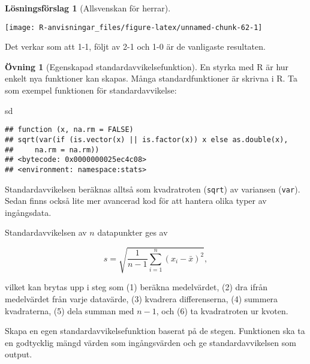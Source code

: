 \documentclass[
]{book}
\newenvironment{Shaded}{\begin{snugshade}}{\end{snugshade}}
\newcommand{\NormalTok}[1]{#1}
\theoremstyle{definition}
\theoremstyle{definition}
\theoremstyle{definition}
\newtheorem{exercise}{Övning}[chapter]
\theoremstyle{definition}
\newtheorem{hypothesis}{Lösningsförslag}[chapter]
\theoremstyle{remark}
\begin{document}
\begin{hypothesis}[Allsvenskan för herrar]
\begin{center}\texttt{[image: R-anvisningar\_files/figure-latex/unnamed-chunk-62-1]} \end{center}

Det verkar som att 1-1, följt av 2-1 och 1-0 är de vanligaste resultaten.
\end{hypothesis}

\begin{exercise}[Egenskapad standardavvikelsefunktion]
En styrka med R är hur enkelt nya funktioner kan skapas. Många standardfunktioner är skrivna i R. Ta som exempel funktionen för standardavvikelse:

\begin{Shaded}
\begin{Highlighting}[]
\NormalTok{sd}
\end{Highlighting}
\end{Shaded}

\begin{verbatim}
## function (x, na.rm = FALSE) 
## sqrt(var(if (is.vector(x) || is.factor(x)) x else as.double(x), 
##     na.rm = na.rm))
## <bytecode: 0x0000000025ec4c08>
## <environment: namespace:stats>
\end{verbatim}

Standardavvikelsen beräknas alltså som kvadratroten (\texttt{sqrt}) av variansen (\texttt{var}). Sedan finns också lite mer avancerad kod för att hantera olika typer av ingångsdata.

Standardavvikelsen av \(n\) datapunkter ges av

\[s = \sqrt{\frac{1}{n-1}\sum_{i=1}^n (x_i - \bar x)^2},\]

vilket kan brytas upp i steg som (1) beräkna medelvärdet, (2) dra ifrån medelvärdet från varje datavärde, (3) kvadrera differenserna, (4) summera kvadraterna, (5) dela summan med \(n-1\), och (6) ta kvadratroten ur kvoten.

Skapa en egen standardavvikelsefunktion baserat på de stegen. Funktionen ska ta en godtycklig mängd värden som ingångsvärden och ge standardavvikelsen som output.
\end{exercise}
\end{document}
